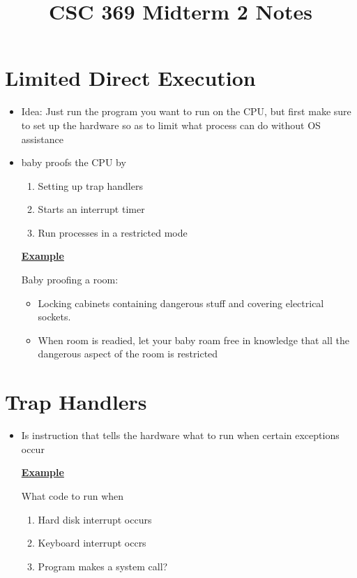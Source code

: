 \documentclass[12pt]{article}
\begin{document}
\title{CSC 369 Midterm 2 Notes}

\section{Limited Direct Execution}

\begin{itemize}
    \item Idea: Just run the program you want to run on the CPU,
    but first make sure to set up the hardware so as to limit what
    process can do without OS assistance
    \item baby proofs the CPU by

    \bigskip

    \begin{enumerate}[1.]
        \item Setting up trap handlers
        \item Starts an interrupt timer
        \item Run processes in a restricted mode
    \end{enumerate}

    \bigskip

    \underline{\textbf{Example}}

    \bigskip

    Baby proofing a room:

    \bigskip

    \begin{itemize}
        \item Locking cabinets containing dangerous stuff and covering electrical sockets.
        \item When room is readied, let your baby roam free in knowledge that all the dangerous
        aspect of the room is restricted
    \end{itemize}
\end{itemize}

\section{Trap Handlers}

\begin{itemize}
    \item Is instruction that tells the hardware what to run when certain exceptions occur

    \bigskip

    \underline{\textbf{Example}}

    \bigskip

    What code to run when

    \begin{enumerate}[1.]
        \item Hard disk interrupt occurs
        \item Keyboard interrupt occrs
        \item Program makes a system call?
    \end{enumerate}

\end{itemize}
\end{document}
